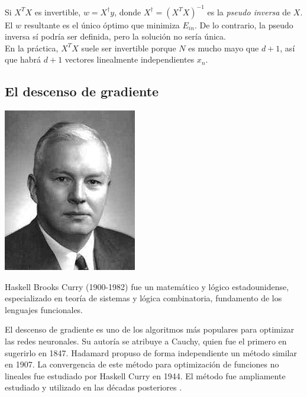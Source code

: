 \documentclass[11pt,twoside,titlepage,a4paper]{article}
\numberwithin{equation}{section} %
\theoremstyle{usual}
\begin{document}
    Si $X^TX$ es invertible, $w = X^\dagger y$, donde $X^\dagger = (X^T X)^{-1}$ es la \textit{pseudo inversa} de $X$. El $w$ resultante es el único óptimo que minimiza $E_{in}$.  De lo contrario,  la pseudo inversa sí podría ser definida, pero la solución no sería única. \\
    
    En la práctica, $X^TX$ suele ser invertible porque $N$ es mucho mayo que $d+1$, así que habrá $d+1$ vectores linealmente independientes $x_n$.

    \subsection{El descenso de gradiente}
    
    \begin{marginfigure}
        \includegraphics[width=0.5\marginparwidth]{Source/images/haskell.jpg}
        \caption{ \scriptsize Haskell Brooks Curry (1900-1982) \cite{haskell-wikipedia} fue un matemático y lógico estadounidense, especializado en teoría de sistemas y lógica combinatoria, fundamento de los lenguajes funcionales.}
    \end{marginfigure}
    
    El descenso de gradiente \cite{descenso-gradiente} \cite{gradient-descent-youtube} es uno de los algoritmos más populares para optimizar las redes neuronales. Su autoría se atribuye a Cauchy, quien fue el primero en sugerirlo en 1847. Hadamard propuso de forma independiente un método similar en 1907. La convergencia de este método para optimización de funciones no lineales fue estudiado por Haskell Curry en 1944. El método fue ampliamente estudiado y utilizado en las décadas posteriores \cite{gradient-descent-wikipedia}.
    
    \newpage\restoregeometry
    
\end{document}
